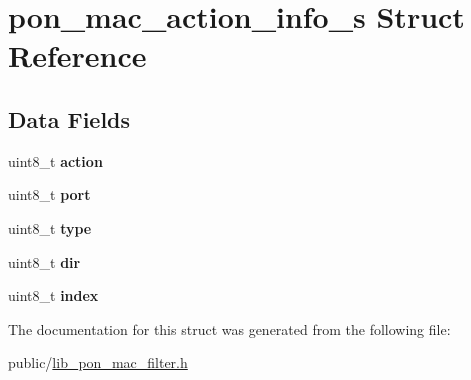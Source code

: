 \hypertarget{structpon__mac__action__info__s}{}\section{pon\+\_\+mac\+\_\+action\+\_\+info\+\_\+s Struct Reference}
\label{structpon__mac__action__info__s}
\subsection*{Data Fields}
\begin{DoxyCompactItemize}
\item 
\mbox{\label{structpon__mac__action__info__s_aaf8570b3964612e1b751d6498f9e6090}} 
uint8\+\_\+t {\bfseries action}
\item 
\mbox{\label{structpon__mac__action__info__s_ab302a1a85126d2bb4dade74c15e89966}} 
uint8\+\_\+t {\bfseries port}
\item 
\mbox{\label{structpon__mac__action__info__s_a219c8e103d10e3375d32f4435fdfa7b0}} 
uint8\+\_\+t {\bfseries type}
\item 
\mbox{\label{structpon__mac__action__info__s_aabf1e3d5d6371674984861f4eb810b77}} 
uint8\+\_\+t {\bfseries dir}
\item 
\mbox{\label{structpon__mac__action__info__s_aa3b36621da3f9bd2576ff1efd1b1cf5d}} 
uint8\+\_\+t {\bfseries index}
\end{DoxyCompactItemize}


The documentation for this struct was generated from the following file\+:\begin{DoxyCompactItemize}
\item 
public/\hyperlink{lib__pon__mac__filter_8h}{lib\+\_\+pon\+\_\+mac\+\_\+filter.\+h}\end{DoxyCompactItemize}
